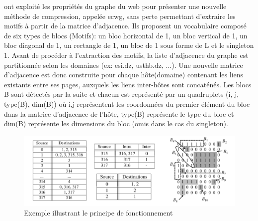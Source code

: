 
	\citep{asano2008efficient} ont exploité les propriétés du graphe du web pour présenter une nouvelle méthode de compression, appelée 
	\gls{ecwg}, sans perte permettant d'extraire les motifs à partir de la matrice d'adjacence. Ils proposent un vocabulaire composé de six types de blocs (Motifs): un bloc horizontal de 1, un bloc vertical de 1, un bloc diagonal de 1, un rectangle de 1, un bloc de 1 sous forme de L et le singleton 1. Avant de procéder à l'extraction des motifs, la liste d'adjacence du graphe est partitionnée selon les domaines (ex: esi.dz, usthb.dz, ...). Une nouvelle matrice d'adjacence est donc construite pour chaque hôte(domaine) contenant les liens existants entre ses pages, auxquels les liens inter-hôtes sont concaténés.
					Les blocs B sont détectés par la suite et chacun est représenté par un quadruplets (i, j, type(B), dim(B)) où i,j représentent les coordonnées du premier élément du bloc dans la matrice d'adjacence de l'hôte, type(B) représente le type du bloc et dim(B) représente les dimensions du bloc (omis dans le cas du singleton). 
					\begin{figure}[h]
					\includegraphics[scale=0.5]{ressources/image/inter_intra.png} 
					\caption{Exemple illustrant le principe de fonctionnement \citep{asano2008efficient}}
					\label{interIntra}
				\end{figure}